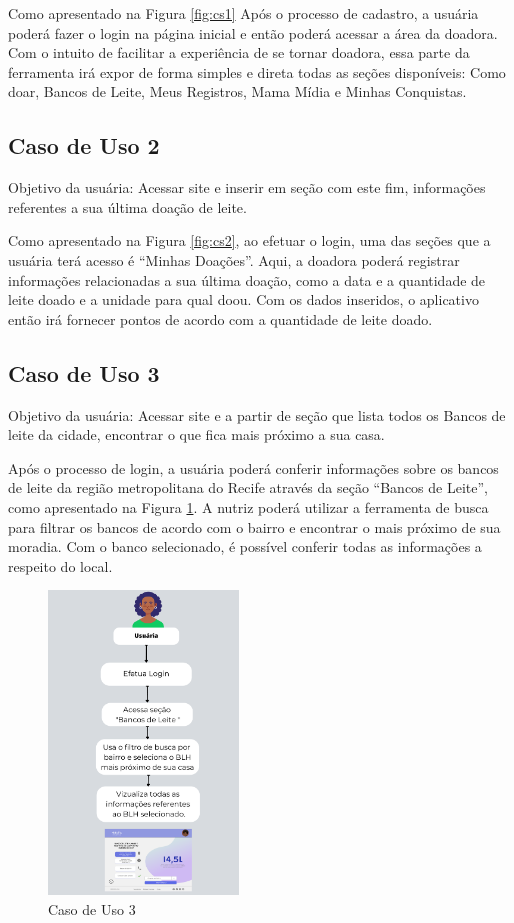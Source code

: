Como apresentado na Figura \ref{fig:cs1} Após o processo de cadastro, a usuária poderá fazer o login na página inicial e então poderá acessar a área da doadora. Com o intuito de facilitar a experiência de se tornar doadora, essa parte da ferramenta irá expor de forma simples e direta todas as seções disponíveis: Como doar, Bancos de Leite, Meus Registros, Mama Mídia e Minhas Conquistas. 

\subsection{Caso de Uso 2}
Objetivo da usuária: Acessar site e inserir em seção com este fim, informações referentes a sua última doação de leite.

Como apresentado na Figura \ref{fig:cs2}, ao efetuar o login, uma das seções que a usuária terá acesso é “Minhas Doações”. Aqui, a doadora poderá registrar informações relacionadas a sua última doação, como a data e a quantidade de leite doado e a unidade para qual doou. Com os dados inseridos, o aplicativo então irá fornecer pontos de acordo com a quantidade de leite doado.

\subsection{Caso de Uso 3}
Objetivo da usuária: Acessar site e a partir de seção que lista todos os Bancos de leite da cidade, encontrar o que fica mais próximo a sua casa.

Após o processo de login, a usuária poderá conferir informações sobre os bancos de leite da região metropolitana do Recife através da seção “Bancos de Leite”, como apresentado na Figura \ref{fig:cs3}. A nutriz poderá utilizar a ferramenta de busca para filtrar os bancos de acordo com o bairro e encontrar o mais próximo de sua moradia. Com o banco selecionado, é possível conferir todas as informações a respeito do local.
\begin{figure}[h]
    \centering
    \includegraphics[width=0.45\textwidth]{Figuras/cs3.pdf}
    \caption{Caso de Uso 3}
    \label{fig:cs3}
\end{figure}


